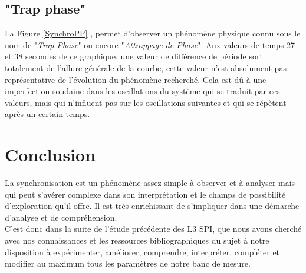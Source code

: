 \documentclass[a4paper,11pt]{report}
\begin{document}
\section{"Trap phase"}
La Figure \ref{SynchroPP} , permet d'observer un phénomène physique connu sous le nom de "{\it Trap Phase}" ou encore "{\it Attrappage de Phase}". Aux valeurs de temps 27 et 38 secondes de ce graphique, une valeur de différence de période sort totalement de l'allure générale de la courbe, cette valeur n'est absolument pas représentative de l'évolution du phénomène recherché. Cela est dû à une imperfection soudaine dans les oscillations du système qui se traduit par ces valeurs, mais qui n'influent pas sur les oscillations suivantes et qui se répètent après un certain temps.
\newpage
\null
\thispagestyle{empty}

\chapter*{Conclusion}
La synchronisation est un phénomène assez simple à observer et à analyser mais qui peut s'avérer complexe dans son interprétation et le champs de possibilité d'exploration qu'il offre. Il est très enrichissant de s'impliquer dans une démarche d'analyse et de compréhension.\\

C'est donc dans la suite de l'étude précédente des L3 SPI, que nous avons cherché avec nos connaissances et les ressources bibliographiques du sujet à notre disposition à expérimenter, améliorer, comprendre, interpréter, compléter et modifier au maximum tous les paramètres de notre banc de mesure.\\
\end{document}
